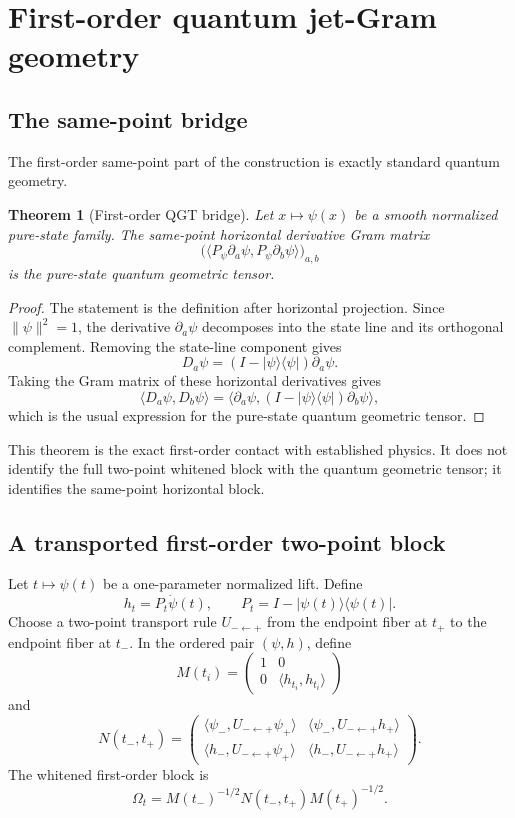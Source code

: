 \documentclass[11pt]{amsart}
\newtheorem{theorem}{Theorem}[section]
\newcommand{\Id}{I}
\begin{document}
\section{First-order quantum jet-Gram geometry}

\subsection{The same-point bridge}

The first-order same-point part of the construction is exactly standard quantum
geometry.

\begin{theorem}[First-order QGT bridge]
Let \(x\mapsto \psi(x)\) be a smooth normalized pure-state family. The
same-point horizontal derivative Gram matrix
\[
        \bigl(\langle P_\psi\partial_a\psi,
                    P_\psi\partial_b\psi\rangle\bigr)_{a,b}
\]
is the pure-state quantum geometric tensor.
\end{theorem}

\begin{proof}
The statement is the definition after horizontal projection. Since
\(\|\psi\|^2=1\), the derivative \(\partial_a\psi\) decomposes into the state
line and its orthogonal complement. Removing the state-line component gives
\[
        D_a\psi=(\Id-|\psi\rangle\langle\psi|)\partial_a\psi.
\]
Taking the Gram matrix of these horizontal derivatives gives
\[
        \langle D_a\psi,D_b\psi\rangle
        =
        \langle\partial_a\psi,
        (\Id-|\psi\rangle\langle\psi|)\partial_b\psi\rangle,
\]
which is the usual expression for the pure-state quantum geometric tensor.
\end{proof}

This theorem is the exact first-order contact with established physics. It does
not identify the full two-point whitened block with the quantum geometric
tensor; it identifies the same-point horizontal block.

\subsection{A transported first-order two-point block}

Let \(t\mapsto \psi(t)\) be a one-parameter normalized lift. Define
\[
        h_t=P_t\dot\psi(t),\qquad P_t=\Id-|\psi(t)\rangle\langle\psi(t)|.
\]
Choose a two-point transport rule \(U_{-\leftarrow +}\) from the endpoint
fiber at \(t_+\) to the endpoint fiber at \(t_-\). In the ordered pair
\((\psi,h)\), define
\[
M(t_i)=
\begin{pmatrix}
1&0\\
0&\langle h_{t_i},h_{t_i}\rangle
\end{pmatrix}
\]
and
\[
N(t_-,t_+)=
\begin{pmatrix}
\langle\psi_-,U_{-\leftarrow +}\psi_+\rangle&
\langle\psi_-,U_{-\leftarrow +}h_+\rangle\\
\langle h_-,U_{-\leftarrow +}\psi_+\rangle&
\langle h_-,U_{-\leftarrow +}h_+\rangle
\end{pmatrix}.
\]
The whitened first-order block is
\[
        \Omega_t=M(t_-)^{-1/2}N(t_-,t_+)M(t_+)^{-1/2}.
\]
\end{document}
